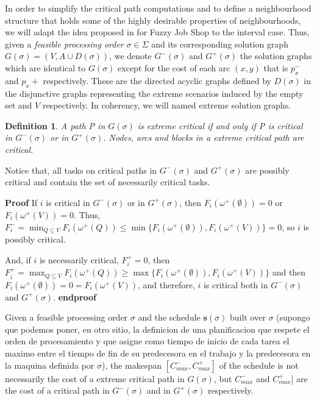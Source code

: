 \documentclass[preprint]{elsarticle}
\newtheorem{definition}{Definition}
\begin{document}
In order to simplify the critical path computations and to define a neighbourhood structure that holds some of the highly desirable properties of neighbourhoods, we will adapt the idea proposed in \cite{GonzalezRodriguez2008b} for Fuzzy Job Shop to the interval case. Thus, given a \textit{feasible processing order} $\sigma \in \Sigma$ and its corresponding solution graph $G(\sigma)= (V, A \cup D(\sigma))$, we denote $G^-(\sigma)$ and $G^+(\sigma)$ the solution graphs which are identical to $G(\sigma)$ except for the cost of each arc $(x,y)$ that is $p_x^-$ and $p_x+$ respectively. These are the directed acyclic graphs defined by $D(\sigma)$ in the disjunctive graphs representing the extreme scenarios induced by the empty set and $V$ respectively. In coherency, we will named extreme solution graphs.

\begin{definition}
A path P in $G(\sigma)$ is \textit{extreme} critical if and only if P is critical in $G^-(\sigma)$ or in $G^+(\sigma)$. Nodes, arcs and blocks in a extreme critical path are critical. 
\end{definition}

Notice that, all tasks on critical paths in $G^-(\sigma)$ and $G^+(\sigma)$ are possibly critical and contain the set of necessarily critical tasks.

\textbf{Proof}
If $i$ is critical in $G^-(\sigma)$ or in $G^+(\sigma)$, then $F_i(\omega^+(\emptyset)) =0$ or $F_i(\omega^+(V)) =0$. Thus, $F_i^- = \min_{Q \subseteq V} F_i(\omega^+(Q)) \leq \min\{F_i(\omega^+(\emptyset)),F_i(\omega^+(V))\}=0$, so $i$ is possibly critical.

And, if $i$ is necessarily critical, $F_i^+ = 0$, then $F_i^+ = \max_{Q \subseteq V} F_i(\omega^+(Q)) \geq \max\{F_i(\omega^+(\emptyset)),F_i(\omega^+(V))\}$ and then $F_i(\omega^+(\emptyset))= 0 = F_i(\omega^+(V))$, and therefore, $i$ is critical both in $G^-(\sigma)$ and $G^+(\sigma)$.
\textbf{endproof}

Given a feasible processing order $\sigma$ and the schedule $\textbf{s}(\sigma)$ built over $\sigma$ (supongo que podemos poner, en otro sitio, la definicion de una planificacion que respete el orden de procesamiento y que asigne como tiempo de inicio de cada tarea el maximo entre el tiempo de fin de su predecesora en el trabajo y la predecesora en la maquina definida por $\sigma$), the makespan $[C_{max}^-, C_{max}^+]$ of the schedule is not necessarily the cost of a extreme critical path in $G(\sigma)$, but $C_{max}^-$ and $C_{max}^+]$ are the cost of a critical path in $G^-(\sigma)$ and in $G^+(\sigma)$ respectively.
\end{document}

